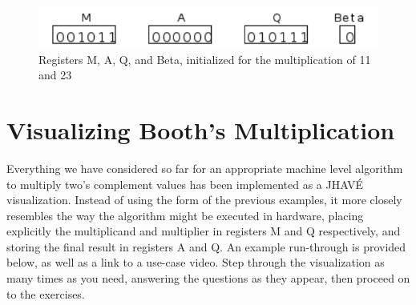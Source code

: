 \documentclass{article}
\begin{document}
\begin{figure}[h]
\centering
\includegraphics{init2.pdf}
\caption{Registers M, A, Q, and Beta, initialized for the multiplication of 11 and 23}
\end{figure}

\section{Visualizing Booth's Multiplication}
Everything we have considered so far for an appropriate machine level algorithm to multiply two's complement values has been implemented as a JHAVÉ visualization.
Instead of using the form of the previous examples, it more closely resembles the way the algorithm might be executed in hardware, placing explicitly the multiplicand and multiplier in registers M and Q respectively, and storing the final result in registers A and Q.
An example run-through is provided below, as well as a link to a use-case video.
Step through the visualization as many times as you need, answering the questions as they appear, then proceed on to the exercises.





%
%
\end{document}
